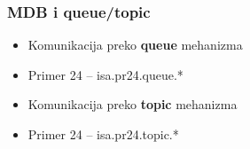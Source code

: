 \documentclass[compress]{beamer}
\begin{document}
\begin{frame}
  \frametitle{MDB i queue/topic}
  \begin{itemize}
    \item Komunikacija preko \textbf{queue} mehanizma
    \item Primer 24 -- isa.pr24.queue.*
  \end{itemize}
  
  \begin{itemize}
    \item Komunikacija preko \textbf{topic} mehanizma
    \item Primer 24 -- isa.pr24.topic.*
  \end{itemize}
\end{frame}
\end{document}
